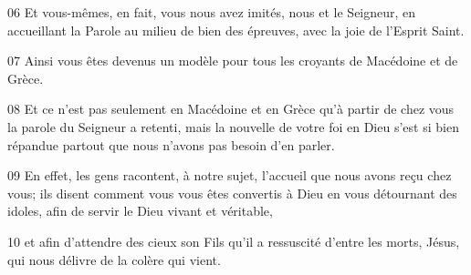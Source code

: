 
06 Et vous-mêmes, en fait, vous nous avez imités, nous et le Seigneur, en accueillant la Parole au milieu de bien des épreuves, avec la joie de l’Esprit Saint.

07 Ainsi vous êtes devenus un modèle pour tous les croyants de Macédoine et de Grèce.

08 Et ce n’est pas seulement en Macédoine et en Grèce qu’à partir de chez vous la parole du Seigneur a retenti, mais la nouvelle de votre foi en Dieu s’est si bien répandue partout que nous n’avons pas besoin d’en parler.

09 En effet, les gens racontent, à notre sujet, l’accueil que nous avons reçu chez vous; ils disent comment vous vous êtes convertis à Dieu en vous détournant des idoles, afin de servir le Dieu vivant et véritable,

10 et afin d’attendre des cieux son Fils qu’il a ressuscité d’entre les morts, Jésus, qui nous délivre de la colère qui vient.

